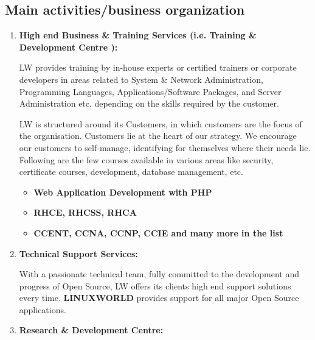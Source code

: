 \documentclass[12pt,oneside,a4paper]{report}
\begin{document}
\subsection{Main activities/business organization}
\begin{enumerate}
\item{\textbf{High end Business \& Training Services (i.e. Training \& Development Centre ):}}\\\vspace{5.0mm}

LW provides training by in-house experts or certified trainers or corporate developers in areas related to System \& Network Administration, Programming Languages, Applications/Software Packages, and Server Administration etc. depending on the skills required by the customer.

LW is structured around its Customers, in which customers are the focus of the organisation. Customers lie at the heart of our strategy. We encourage our customers to self-manage, identifying for themselves where their needs lie. Following are the few courses available in various areas like security, certificate courses, development, database management, etc.\\\vspace{5.0mm}
\begin{itemize}
\item{\textbf{Web Application Development with PHP}}\\
\item{\textbf{RHCE, RHCSS, RHCA}}\\
\item{\textbf{CCENT, CCNA, CCNP, CCIE and many more in the list}}
\end{itemize}

\item{\textbf{Technical Support Services:}}

With a passionate technical team, fully committed to the development and progress of Open Source, LW offers its clients high end support solutions every time. \textbf{LINUXWORLD} provides support for all major Open Source applications.
\vspace{2.0mm}
\item{\textbf{Research \& Development Centre:}}


\end{enumerate}
\end{document}
